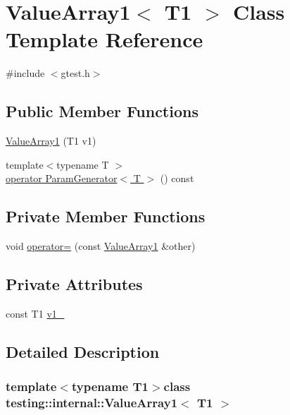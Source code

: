 \hypertarget{classtesting_1_1internal_1_1ValueArray1}{\section{\-Value\-Array1$<$ \-T1 $>$ \-Class \-Template \-Reference}
\label{d2/de9/classtesting_1_1internal_1_1ValueArray1}
}


{\ttfamily \#include $<$gtest.\-h$>$}

\subsection*{\-Public \-Member \-Functions}
\begin{DoxyCompactItemize}
\item 
\hyperlink{classtesting_1_1internal_1_1ValueArray1_ac3a48845dd1a5ea81d25e8bb297b1f0f}{\-Value\-Array1} (\-T1 v1)
\item 
{\footnotesize template$<$typename T $>$ }\\\hyperlink{classtesting_1_1internal_1_1ValueArray1_a08ef46fa12c9dd8ef6fc630baeea89b7}{operator Param\-Generator$<$ T $>$} () const 
\end{DoxyCompactItemize}
\subsection*{\-Private \-Member \-Functions}
\begin{DoxyCompactItemize}
\item 
void \hyperlink{classtesting_1_1internal_1_1ValueArray1_a6d4c17ad807724ddc15b387e573b66ac}{operator=} (const \hyperlink{classtesting_1_1internal_1_1ValueArray1}{\-Value\-Array1} \&other)
\end{DoxyCompactItemize}
\subsection*{\-Private \-Attributes}
\begin{DoxyCompactItemize}
\item 
const \-T1 \hyperlink{classtesting_1_1internal_1_1ValueArray1_aac1d0654cc6c1aceb4a5d0fa7a98042e}{v1\-\_\-}
\end{DoxyCompactItemize}


\subsection{\-Detailed \-Description}
\subsubsection*{template$<$typename T1$>$class testing\-::internal\-::\-Value\-Array1$<$ T1 $>$}



